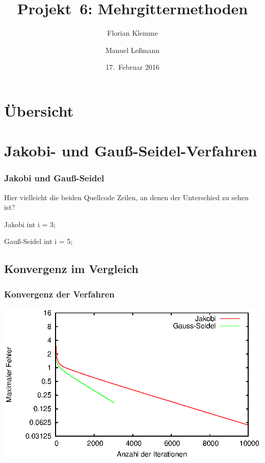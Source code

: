 \documentclass{beamer}
\begin{document}
\title{Projekt~6: Mehrgittermethoden}
\author{Florian Klemme \and Manuel Leßmann}
\date{17.~Februar 2016}

\begin{frame}
    \titlepage
\end{frame}

\section*{Übersicht}
\begin{frame}
    \tableofcontents
\end{frame}

\section{Jakobi- und Gauß-Seidel-Verfahren}
\begin{frame}
    \frametitle{Jakobi und Gauß-Seidel}
    Hier vielleicht die beiden Quellcode Zeilen, an denen der Unterschied zu sehen ist?
    \begin{block}{Jakobi}
        int i = 3;
    \end{block}
    \begin{block}{Gauß-Seidel}
        int i = 5;
    \end{block}
\end{frame}

\subsection{Konvergenz im Vergleich}
\begin{frame}
    \frametitle{Konvergenz der Verfahren}
    \includegraphics[width=\textwidth]{fehlerpresentation}
\end{frame}
\end{document}
